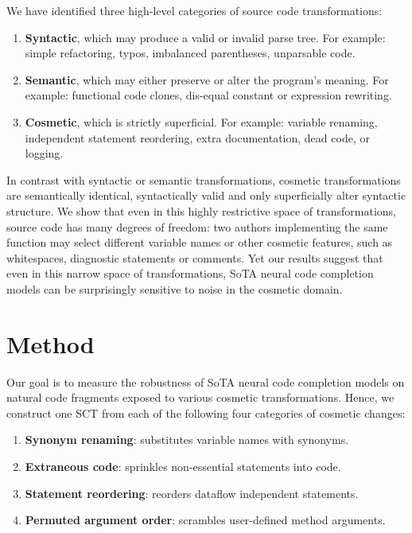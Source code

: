 \documentclass[usenames,dvipsnames]{article} %
\begin{document}
We have identified three high-level categories of source code transformations:

  \begin{enumerate}[itemsep=1ex]
    \item \textbf{Syntactic}, which may produce a valid or invalid parse tree. For example: simple refactoring, typos, imbalanced parentheses, unparsable code.
    \item \textbf{Semantic}, which may either preserve or alter the program's meaning. For example: functional code clones, dis-equal constant or expression rewriting.
    \item \textbf{Cosmetic}, which is strictly superficial. For example: variable renaming, independent statement reordering, extra documentation, dead code, or logging.
  \end{enumerate}

  In contrast with syntactic or semantic transformations, cosmetic transformations are semantically identical, syntactically valid and only superficially alter syntactic structure. We show that even in this highly restrictive space of transformations, source code has many degrees of freedom: two authors implementing the same function may select different variable names or other cosmetic features, such as whitespaces, diagnostic statements or comments.  Yet our results suggest that even in this narrow space of transformations, SoTA neural code completion models can be surprisingly sensitive to noise in the cosmetic domain.

  \section{Method}\label{sec:method}

  Our goal is to measure the robustness of SoTA neural code completion models on natural code fragments exposed to various cosmetic transformations. Hence, we construct one SCT from each of the following four categories of cosmetic changes:

  \begin{enumerate}[itemsep=1ex]
    \item \textbf{Synonym renaming}: substitutes variable names with synonyms.
    \item \textbf{Extraneous code}: sprinkles non-essential statements into code.
    \item \textbf{Statement reordering}: reorders dataflow independent statements.
    \item \textbf{Permuted argument order}: scrambles user-defined method arguments.
  \end{enumerate}
\end{document}
